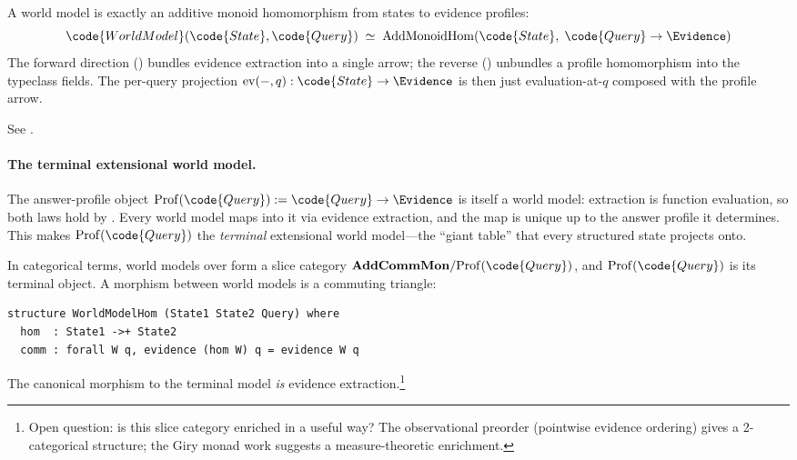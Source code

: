 \documentclass[11pt,openany]{report}
\begin{document}
\begin{theorem}
\label{thm:universal-property}
A world model is exactly an additive monoid homomorphism from states
to evidence profiles:
\[
  \code{WorldModel}(\code{State}, \code{Query})
  \;\simeq\;
  \mathrm{AddMonoidHom}(\code{State},\; \code{Query} \to \Evidence)
\]
The forward direction () bundles evidence
extraction into a single arrow; the reverse
() unbundles a profile homomorphism into the
typeclass fields.  The per-query projection
$\mathrm{ev}(-,q) : \code{State} \to \Evidence$ is then just
evaluation-at-$q$ composed with the profile arrow.
\end{theorem}

\noindent
See .

\paragraph{The terminal extensional world model.}
The answer-profile object $\mathrm{Prof}(\code{Query}) :=
\code{Query} \to \Evidence$ is itself a world model: extraction is
function evaluation, so both laws hold by .  Every world
model maps into it via evidence extraction, and the map is unique
up to the answer profile it determines.  This makes
$\mathrm{Prof}(\code{Query})$ the \emph{terminal} extensional world
model---the ``giant table'' that every structured state projects
onto.

In categorical terms, world models over  form a slice
category $\mathbf{AddCommMon} / \mathrm{Prof}(\code{Query})$,
and $\mathrm{Prof}(\code{Query})$ is its terminal object.  A morphism
between world models is a commuting triangle:

\begin{lstlisting}
structure WorldModelHom (State1 State2 Query) where
  hom  : State1 ->+ State2
  comm : forall W q, evidence (hom W) q = evidence W q
\end{lstlisting}

\noindent
The canonical morphism to the terminal model \emph{is} evidence
extraction.\footnote{Open question: is this slice category enriched
in a useful way?  The observational preorder (pointwise evidence
ordering) gives a 2-categorical structure; the Giry monad work
suggests a measure-theoretic enrichment.}
\end{document}
